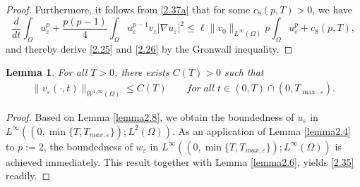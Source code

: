 \documentclass[12pt]{article}
\theoremstyle{plain}
\newtheorem{lemma}{Lemma}[section]
\theoremstyle{definition}
\numberwithin{equation}{section}
\begin{document}
\begin{proof}
   Furthermore, it follows from \eqref{2.37a} that for some $c_8(p,T)>0$, we have
  \begin{equation*}
  \frac{d}{dt}\int_\Omega u_\varepsilon^p+\frac{p(p-1)}{4}\int_\Omega u_\varepsilon^{p-1}v_\varepsilon|\nabla u_\varepsilon|^2
           \leq \ell \|v_0\|_{L^\infty(\Omega)}p \int_\Omega u_\varepsilon^p+ c_8(p,T),
  \end{equation*}
  and thereby derive \eqref{2.25} and \eqref{2.26} by the Gronwall inequality.
\end{proof}

\begin{lemma}\label{lemma2.9} For all $T>0$, there exists  $C(T)>0$ such that
\begin{align}\label{2.35}
   \|v_{\varepsilon}(\cdot,t)\|_{W^{1,\infty}(\Omega)}\leq C(T)\qquad for\; all\; t\in (0,T)\cap(0,T_{\max,\varepsilon}).
\end{align}
\end{lemma}
\begin{proof}
    Based on Lemma \ref{lemma2.8}, we obtain the boundedness of $u_{\varepsilon}$ in $L^{\infty}((0,\min\{T,T_{max,\varepsilon}\});L^2(\Omega))$. As an application of Lemma \ref{lemma2.4} to $p:=2$,  the boundedness of $w_{\varepsilon}$ in $L^{\infty}((0,\min\{T,T_{max,\varepsilon}\});L^\infty(\Omega))$ is achieved
    immediately. This result together with Lemma \ref{lemma2.6}, yields \eqref{2.35} readily.
\end{proof}
\end{document}
